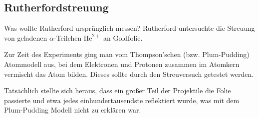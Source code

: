 

\subsection{Rutherfordstreuung}

\begin{fquestion}{Was wollte Rutherford ursprünglich messen?}
    Rutherford untersuchte die Streuung von geladenen $\alpha$-Teilchen $\mathrm{He}^{2+}$ an Goldfolie.
    
    Zur Zeit des Experiments ging man vom Thompson'schen (bzw. Plum-Pudding) Atommodell aus, bei dem Elektronen und Protonen zusammen im Atomkern vermischt das Atom bilden.
    Dieses sollte durch den Streuversuch getestet werden.
    
    Tatsächlich stellte sich heraus, dass ein großer Teil der Projektile die Folie passierte und etwa jedes einhundertausendste reflektiert wurde, was mit dem Plum-Pudding Modell nicht zu erklären war.
\end{fquestion}

